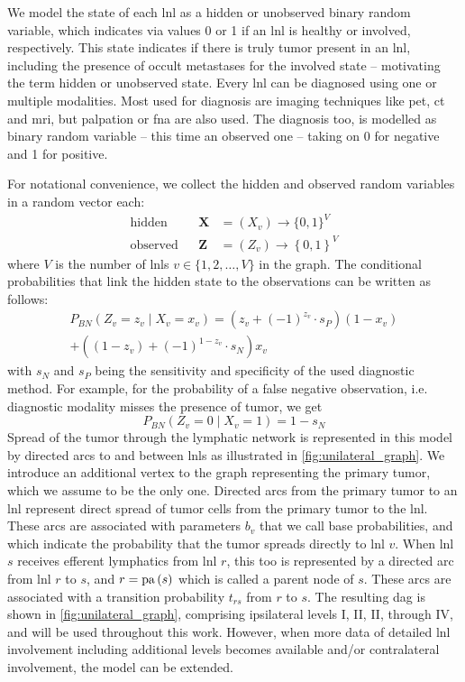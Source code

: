 \documentclass[../ms.tex]{subfiles}
\begin{document}
We model the state of each \gls{lnl} as a hidden or unobserved binary random variable, which indicates via values 0 or 1 if an \gls{lnl} is healthy or involved, respectively. This state indicates if there is truly tumor present in an \gls{lnl}, including the presence of occult metastases for the involved state – motivating the term hidden or unobserved state. Every \gls{lnl} can be diagnosed using one or multiple modalities. Most used for diagnosis are imaging techniques like \gls{pet}, \gls{ct} and \gls{mri}, but palpation or \gls{fna} are also used. The diagnosis too, is modelled as binary random variable – this time an observed one – taking on 0 for negative and 1 for positive.

For notational convenience, we collect the hidden and observed random variables in a random vector each:
%
\begin{equation}
    \begin{aligned}
        \text{hidden}& & \mathbf{X} &= ( X_v ) \rightarrow \{ 0,1 \}^V \\
        \text{observed}& & \mathbf{Z} &= ( Z_v ) \rightarrow \left\{ 0, 1 \right\}^V
    \end{aligned}
\end{equation}
%
where $V$ is the number of \glspl{lnl} $v \in \{ 1,2,\ldots,V \}$ in the graph. The conditional probabilities that link the hidden state to the observations can be written as follows:
%
\begin{multline}
    P_{BN} \left( Z_v = z_v \mid X_v = x_v \right) = \left( z_v + (-1)^{z_v} \cdot s_P \right)(1 - x_v) \\ 
    + \left( (1 - z_v) + (-1)^{1 - z_v} \cdot s_N \right) x_v
\end{multline}
%
with $s_N$ and $s_P$ being the sensitivity and specificity of the used diagnostic method. For example, for the probability of a false negative observation, i.e. diagnostic modality misses the presence of tumor, we get
%
\begin{equation}
    P_{BN} \left( Z_v = 0 \mid X_v = 1 \right) = 1 - s_N
\end{equation}
%
Spread of the tumor through the lymphatic network is represented in this model by directed arcs to and between \glspl{lnl} as illustrated in \cref{fig:unilateral_graph}. We introduce an additional vertex to the graph representing the primary tumor, which we assume to be the only one. Directed arcs from the primary tumor to an \gls{lnl} represent direct spread of tumor cells from the primary tumor to the \gls{lnl}. These arcs are associated with parameters $b_v$ that we call base probabilities, and which indicate the probability that the tumor spreads directly to \gls{lnl} $v$. When \gls{lnl} $s$ receives efferent lymphatics from \gls{lnl} $r$, this too is represented by a directed arc from \gls{lnl} $r$ to $s$, and $r=\operatorname{pa}{(s)}$ which is called a parent node of $s$. These arcs are associated with a transition probability $t_{rs}$ from $r$ to $s$. The resulting \gls{dag} is shown in \cref{fig:unilateral_graph}, comprising ipsilateral levels I, II, II, through IV, and will be used throughout this work. However, when more data of detailed \gls{lnl} involvement including additional levels becomes available and/or contralateral involvement, the model can be extended.
\end{document}
